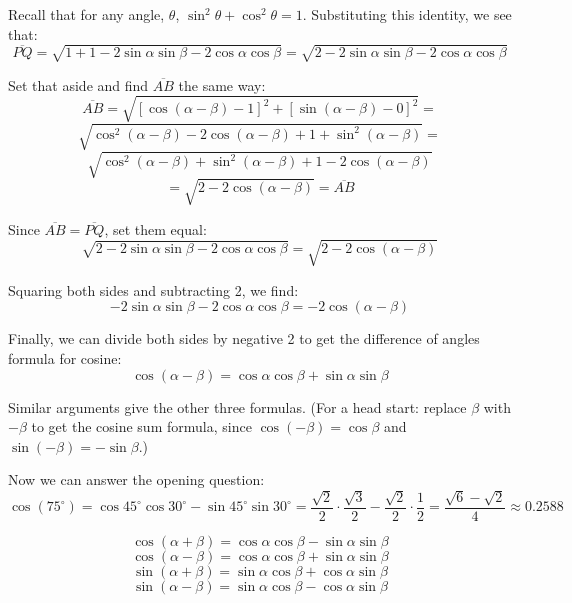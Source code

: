 Recall that for any angle, $\theta$, $\sin^2{\theta} + \cos^2{\theta} = 1$. 
Substituting this identity, we see that:
$$\overline{PQ} = \sqrt{1 + 1 -2\sin{\alpha}\sin{\beta} - 2\cos{\alpha}\cos{
\beta}} = \sqrt{2 - 2\sin{\alpha}\sin{\beta} - 2\cos{\alpha}\cos{\beta}}$$

Set that aside and find $\overline{AB}$ the same way:
$$\overline{AB} = \sqrt{\left[ \cos{\left( \alpha - \beta \right)} - 1 \right]^
2 + \left[ \sin{\left( \alpha - \beta \right)} - 0 \right]^2} = $$
$$\sqrt{\cos^2{ \left( \alpha - \beta \right)} - 2\cos{ \left( \alpha - \beta 
\right)} + 1 + \sin^2{ \left( \alpha - \beta \right)}} = $$
$$\sqrt{\cos^2{ \left( \alpha - \beta \right)} + \sin^2{ \left( \alpha - \beta 
\right)} + 1 - 2\cos{ \left( \alpha - \beta \right)}} $$
$$= \sqrt{2 - 2\cos{ \left( \alpha - \beta \right)}} = \overline{AB}$$

Since $\overline{AB} = \overline{PQ}$, set them equal:
$$ \sqrt{2 - 2\sin{\alpha}\sin{\beta} - 2\cos{\alpha}\cos{\beta}} = \sqrt{2 - 2
\cos{ \left( \alpha - \beta \right)}}$$

Squaring both sides and subtracting 2, we find:
$$-2\sin{\alpha}\sin{\beta} - 2\cos{\alpha}\cos{\beta} = -2\cos{\left( \alpha -
\beta \right)}$$

Finally, we can divide both sides by negative 2 to get the difference of 
angles formula for cosine:
$$\cos{ \left( \alpha - \beta \right)} = \cos{\alpha}\cos{\beta} + \sin{\alpha}
\sin{\beta}$$

Similar arguments give the other three formulas. (For a head start:
replace $\beta$ with $-\beta$ to get the cosine sum formula, since
$\cos(-\beta) = \cos\beta$ and $\sin(-\beta) = -\sin\beta$.)

Now we can answer the opening question:
$$\cos(75^\circ) = \cos 45^\circ \cos 30^\circ - \sin 45^\circ \sin 30^\circ
= \frac{\sqrt{2}}{2}\cdot\frac{\sqrt{3}}{2} - \frac{\sqrt{2}}{2}\cdot\frac{1}{2}
= \frac{\sqrt{6} - \sqrt{2}}{4} \approx 0.2588$$ 

\begin{mdframed}[style=important, frametitle={Sum and Difference Formulas}]
$$\cos{ \left( \alpha + \beta \right)} = \cos{\alpha}\cos{\beta} - \sin{\alpha}
\sin{\beta}$$
$$\cos{ \left( \alpha - \beta \right)} = \cos{\alpha}\cos{\beta} + \sin{\alpha}
\sin{\beta}$$
$$\sin{ \left( \alpha + \beta \right)} = \sin{\alpha}\cos{\beta} + \cos{\alpha}
\sin{\beta}$$
$$\sin{ \left( \alpha - \beta \right)} = \sin{\alpha}\cos{\beta} - \cos{\alpha}
\sin{\beta}$$
\end{mdframed}

